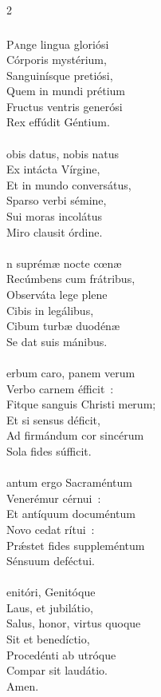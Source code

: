 \documentclass[9pt,twoside]{extarticle}
\begin{document}
\begin{multicols}{2}
{{\subsubsection*{\center{}}
\lettrine{P}ange lingua gloriósi\\ 
Córporis mystérium,\\ 
Sanguinísque pretiósi,\\ 
Quem in mundi prétium\\ 
Fructus ventris generósi\\ 
Rex effúdit Géntium.\\
\\
obis datus, nobis natus\\ 
Ex intácta Vírgine,\\ 
Et in mundo conversátus,\\ 
Sparso verbi sémine,\\ 
Sui moras incolátus\\ 
Miro clausit órdine.\\ 
\\
n suprémæ nocte cœnæ\\ 
Recúmbens cum frátribus,\\ 
Observáta lege plene\\ 
Cibis in legálibus,\\ 
Cibum turbæ duodénæ\\ 
Se dat suis mánibus.\\
\\
erbum caro, panem verum\\ 
Verbo carnem éfficit~:\\ 
Fitque sanguis Christi merum;\\ 
Et si sensus déficit,\\ 
Ad firmándum cor sincérum\\ 
Sola fides súfficit.\\
\\
antum ergo Sacraméntum\\ 
Venerémur cérnui~:\\ 
Et antíquum documéntum\\ 
Novo cedat rítui~:\\ 
Prǽstet fides suppleméntum\\ 
Sénsuum deféctui.\\
\\
enitóri, Genitóque\\ 
Laus, et jubilátio,\\ 
Salus, honor, virtus quoque\\ 
Sit et benedíctio,\\ 
Procedénti ab utróque\\ 
Compar sit laudátio.\\
Amen.

}}
\end{multicols}
\end{document}
